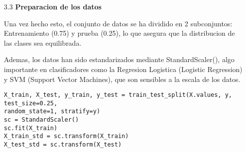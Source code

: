 \documentclass{article}
\begin{document}
\bigskip

\begin{itemize}

\item[3.3]  {\bf Preparacion de los datos}

Una vez hecho esto, el conjunto de datos se ha dividido en 2 subconjuntos: Entrenamiento (0.75) y prueba (0.25), lo que asegura que la distribucion de las clases sea equilibrada.

Ademas, los datos han sido estandarizados mediante StandardScaler(), algo importante en clasificadores como la Regresion Logistica (Logistic Regression) y SVM (Support Vector Machines), que son sensibles a la escala de los datos.

\begin{tcolorbox}[width=14cm]
\begin{scriptsize}
\begin{verbatim}
X_train, X_test, y_train, y_test = train_test_split(X.values, y, test_size=0.25,
random_state=1, stratify=y)
sc = StandardScaler()
sc.fit(X_train)
X_train_std = sc.transform(X_train)
X_test_std = sc.transform(X_test)
\end{verbatim}
\end{scriptsize}
\end{tcolorbox}

\end{itemize}

\bigskip
\end{document}
